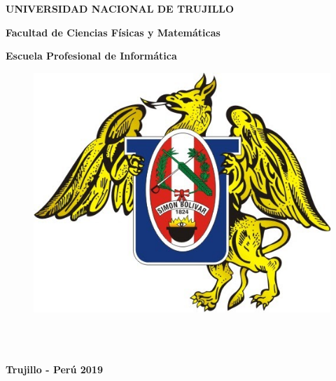 \textheight 19cm
\pagestyle{empty}
\begin{center}
 {\bf {\fontsize{14}{16.8}\selectfont UNIVERSIDAD NACIONAL DE TRUJILLO}}     
 
    {\bf{\fontsize{14}{16.8}\selectfont Facultad de Ciencias Físicas y Matemáticas}} 

  {\bf{\fontsize{14}{16.8}\selectfont Escuela Profesional de Informática}}
\end{center}  

\begin{figure}[ht]
\begin{center}
\includegraphics[width=.4\textwidth]{unt}
\end{center}
\end{figure}

\vskip 2cm
\begin{center}
  { \bf {\fontsize{17}{20.4}\selectfont{MODELO PARA LA RUTERIZACIÓN }}     
  \vskip 3cm
  {\bf \fontsize{14}{16.8}}} \\
    {\bf \fontsize{14}{16.8}}\\
    \vskip 0.2cm
    {\bf \fontsize{14}{16.8}}

     
\end{center}   


\vskip 1.1cm
\begin{center}    
{\bf {\fontsize{14}{16.8}\selectfont Trujillo - Perú
\vskip 0.0cm
\hspace*{-0.2cm} 
2019 }}
\end{center} 
\newpage


